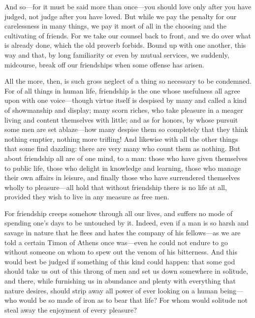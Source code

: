  And so—for it must be said more than once—you should love only after you have judged, not judge after you have loved. But while we pay the penalty for our carelessness in many things, we pay it most of all in the choosing and the cultivating of friends. For we take our counsel back to front, and we do over what is already done, which the old proverb forbids. Bound up with one another, this way and that, by long familiarity or even by mutual services, we suddenly, midcourse, break off our friendships when some offense has arisen.

 All the more, then, is such gross neglect of a thing so necessary to be condemned. For of all things in human life, friendship is the one whose usefulness all agree upon with one voice—though virtue itself is despised by many and called a kind of showmanship and display; many scorn riches, who take pleasure in a meager living and content themselves with little; and as for honors, by whose pursuit some men are set ablaze—how many despise them so completely that they think nothing emptier, nothing more trifling! And likewise with all the other things that some find dazzling: there are very many who count them as nothing. But about friendship all are of one mind, to a man: those who have given themselves to public life, those who delight in knowledge and learning, those who manage their own affairs in leisure, and finally those who have surrendered themselves wholly to pleasure—all hold that without friendship there is no life at all, provided they wish to live in any measure as free men.

 For friendship creeps somehow through all our lives, and suffers no mode of spending one's days to be untouched by it. Indeed, even if a man is so harsh and savage in nature that he flees and hates the company of his fellows—as we are told a certain Timon of Athens once was—even he could not endure to go without someone on whom to spew out the venom of his bitterness. And this would best be judged if something of this kind could happen: that some god should take us out of this throng of men and set us down somewhere in solitude, and there, while furnishing us in abundance and plenty with everything that nature desires, should strip away all power of ever looking on a human being—who would be so made of iron as to bear that life? For whom would solitude not steal away the enjoyment of every pleasure?

